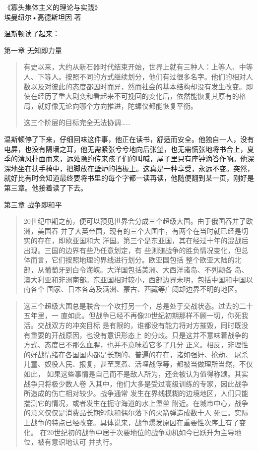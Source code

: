 \begin{center}
  《寡头集体主义的理论与实践》\\
  埃曼纽尔•高德斯坦因 著
\end{center}

温斯顿读了起来：

\begin{center}
第一章 无知即力量
\end{center}

\begin{quotation}
有史以来，大约从新石器时代结束开始，世界上就有三种人：上等人、中等人、下等人。按照不同的方式继续划分，他们有过很多名字。他们的相对人数以及对彼此的态度都因时而异，然而社会的基本结构却没有发生改变。即使在经历了重大剧变和看起来不可挽回的变化后，依然能恢复其原有的格局，就好像无论向哪个方向推进，陀螺仪都能恢复平衡。\par
这三个阶层的目标完全无法协调\ldots\ldots{}
\end{quotation}

温斯顿停了下来，仔细回味这件事，他正在读书，舒适而安全。他独自一人，没有电屏，也没有隔墙之耳，他无需紧张兮兮地向后张望，也无需慌张地将书合上，夏季的清风扑面而来，远处隐约传来孩子们的叫喊，屋子里只有座钟滴答作响。他深深地坐在扶手椅中，把脚放在壁炉的挡板上。这真是一种享受，永远不变。突然，就好比有时会知道最终要将书里的每个字都一读再读，他随便翻到某一页，刚好是第三章。他接着读了下去。

\begin{center}
第三章 战争即和平
\end{center}

\begin{quotation}
20世纪中期之前，便可以预见世界会分成三个超级大国。由于俄国吞并了欧洲，美国吞
并了大英帝国，现有的三个大国中，有两个在当时就已经是切实的存在，即欧亚国和大
洋国。第三个是东亚国，其在经过十年的混战后出现。三国的边界有些乃任意划定，有
些则随战争的胜负情况变化，但总体而言，它们按照地理的界线进行划分。欧亚国包括
整个欧亚大陆的北部，从葡萄牙到白令海峡。大洋国包括美洲、大西洋诸岛、不列颠各
岛、澳大利亚和非洲南部。东亚国相对较小，西部边界未明，包括中国和中国以南各个
国家、日本各岛及满洲、蒙古、西藏等广阔却边界不明的地区。
\end{quotation}

\begin{quotation}
这三个超级大国总是联合一个攻打另一个，总是处于交战状态。过去的二十五年里，一
直如此。但战争已经不再像20世纪初期那样不顾一切，你死我活。交战双方的冲突目标
是有限的，谁都没有能力将对方摧毁，同时既没有重要的开战原因，也没有意识形态上
的分歧。只是这并不意味着战争的方式、态度已不那么血腥，也并不意味着它多了几分
正义。相反，非理性的好战情绪在各国国内都是长期的、普遍的存在，诸如强奸、抢劫、
屠杀儿童、奴役人民、报复，甚至烹煮、活埋战俘等，都被当做理所当然，不仅如此，
如果这些事情是自己而不是敌人所为，还会被认为值得称颂。其实战争只将极少数人卷
入其中，他们大多是受过高级训练的专家，因此战争所造成的伤亡相对较少。战争通常
发生在界线模糊的边境地区，人们只能揣测它的情况，或者发生在扼守海道的水上堡垒
附近。在城市中心，战争的意义仅仅是消费品长期短缺和偶尔落下的火箭弹造成数十人
死亡。实际上战争的特点已经改变。具体说来，战争爆发原因在重要性次序上有了变化。
在20世纪初的战争中居于次要地位的战争动机如今已跃升为主导地位，被有意识地认可
并执行。
\end{quotation}

